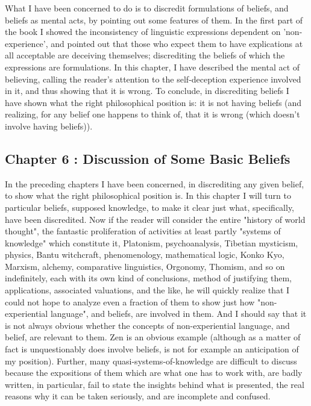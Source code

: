 \documentclass[10pt,twoside]{memoir}
\begin{document}
\begin{enumerate}
{What I have been concerned to do is to discredit formulations of 
beliefs, and beliefs as mental acts, by pointing out some features of them. In 
the first part of the book I showed the inconsistency of linguistic expressions 
dependent on 'non-experience', and pointed out that those who expect them 
to have explications at all acceptable are deceiving themselves; discrediting 
the beliefs of which the expressions are formulations. In this chapter, I have 
described the mental act of believing, calling the reader's attention to the 
self-deception experience involved in it, and thus showing that it is wrong. 
To conclude, in discrediting beliefs I have shown what the right 
philosophical position is: it is not having beliefs (and realizing, for any belief 
one happens to think of, that it is wrong (which doesn't involve having beliefs)). 

\subsection*{Chapter 6 : Discussion of Some Basic Beliefs}

In the preceding chapters I have been concerned, in discrediting any 
given belief, to show what the right philosophical position is. In this chapter 
I will turn to particular beliefs, supposed knowledge, to make it clear just 
what, specifically, have been discredited. Now if the reader will consider the 
entire "history of world thought", the fantastic proliferation of activities at 
least partly "systems of knowledge" which constitute it, Platonism, 
psychoanalysis, Tibetian mysticism, physics, Bantu witchcraft, 
phenomenology, mathematical logic, Konko Kyo, Marxism, alchemy, 
comparative linguistics, Orgonomy, Thomism, and so on indefinitely, each 
with its own kind of conclusions, method of justifying them, applications, 
associated valuations, and the like, he will quickly realize that I could not 
hope to analyze even a fraction of them to show just how "non-experiential 
language", and beliefs, are involved in them. And I should say that it is not 
always obvious whether the concepts of non-experiential language, and 
belief, are relevant to them. Zen is an obvious example (although as a matter 
of fact is unquestionably does involve beliefs, is not for example an 
anticipation of my position). Further, many quasi-systems-of-knowledge are 
difficult to discuss because the expositions of them which are what one has 
to work with, are badly written, in particular, fail to state the insights behind 
what is presented, the real reasons why it can be taken seriously, and are 
incomplete and confused. 

}
\end{enumerate}
\end{document}
